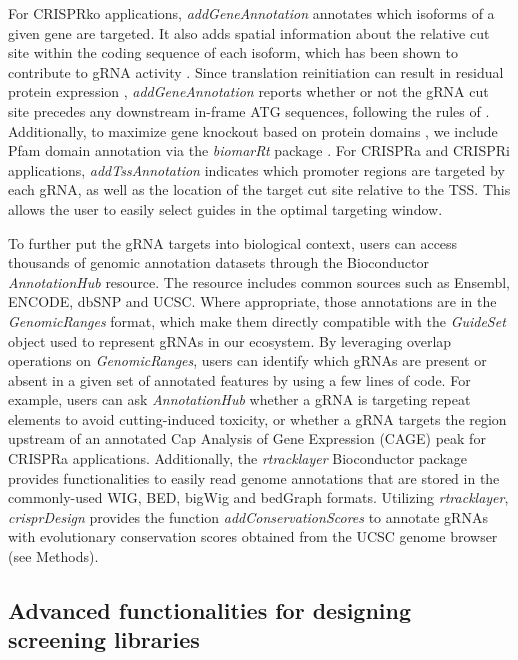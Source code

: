 \documentclass[pdftex,english,10pt]{article}
\begin{document}
For CRISPRko applications, \textit{addGeneAnnotation} annotates which isoforms of a given gene are targeted. It also adds spatial information about the relative cut site within the coding sequence of each isoform, which has been shown to contribute to gRNA activity \citep{azimuth}. Since translation reinitiation can result in residual protein expression \citep{smits2019biological}, \textit{addGeneAnnotation} reports whether or not the gRNA cut site precedes any downstream in-frame ATG sequences, following the rules of \citet{cohen2019nonsense}. Additionally, to maximize gene knockout based on protein domains \citep{he2019novo}, we include Pfam domain annotation \citep{pfam} via the \textit{biomarRt} package \citep{biomart}. For CRISPRa and CRISPRi applications, \textit{addTssAnnotation} indicates which promoter regions are targeted by each gRNA, as well as the location of the target cut site relative to the TSS. This allows the user to easily select guides in the optimal targeting window. 
 
To further put the gRNA targets into biological context, users can access thousands of genomic annotation datasets through the Bioconductor \textit{AnnotationHub} resource.  The resource includes common sources such as Ensembl, ENCODE, dbSNP and UCSC. Where appropriate, those annotations are in the \textit{GenomicRanges} format, which make them directly compatible with the \textit{GuideSet} object used to represent gRNAs in our ecosystem. By leveraging overlap operations on \textit{GenomicRanges}, users can identify which gRNAs are present or absent in a given set of annotated features by using a few lines of code.  For example, users can ask \textit{AnnotationHub} whether a gRNA is targeting repeat elements to avoid cutting-induced toxicity, or whether a gRNA targets the region upstream of an annotated Cap Analysis of Gene Expression (CAGE) peak for CRISPRa applications. Additionally, the \textit{rtracklayer} Bioconductor package \citep{rtracklayer} provides functionalities to easily read genome annotations that are stored in the commonly-used WIG, BED, bigWig and bedGraph formats. Utilizing \textit{rtracklayer}, \textit{crisprDesign} provides the function \textit{addConservationScores} to annotate gRNAs with evolutionary conservation scores obtained from the UCSC genome browser (see Methods). 




\subsection{Advanced functionalities for designing screening libraries}
\end{document}
